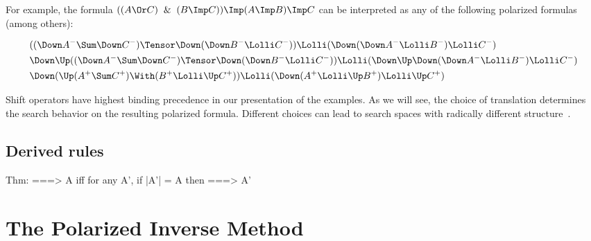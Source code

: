 For example, the formula $((A \Or C) \And (B \Imp C)) \Imp (A \Imp B) \Imp C$
can be interpreted as any of the following polarized formulas (among others):

{\small
\begin{align*}
&((\Down A^- \Sum \Down C^-) \Tensor \Down(\Down B^- \Lolli C^-)) \Lolli (\Down (\Down A^- \Lolli B^-) \Lolli C^-) \\
&\Down\Up((\Down A^- \Sum \Down C^-) \Tensor \Down(\Down B^- \Lolli C^-)) \Lolli (\Down\Up\Down (\Down A^- \Lolli B^-) \Lolli C^-) \\
&\Down(\Up (A^+ \Sum C^+) \With (B^+ \Lolli \Up C^+)) \Lolli (\Down (A^+ \Lolli \Up B^+) \Lolli \Up C^+)
\end{align*}
}

Shift operators have highest binding precedence in our presentation of the
examples.  As we will see, the choice of translation determines the search
behavior on the resulting polarized formula.  Different choices can lead to
search spaces with radically different structure~\cite{Chaudhuri.2006.IJCAR}.


\subsection{Derived rules}
\label{prop.sec.derived}

Thm: ===> A iff for any A', if |A'| = A then ===> A'

\section{The Polarized Inverse Method}\label{prop.sec.pinverse}

